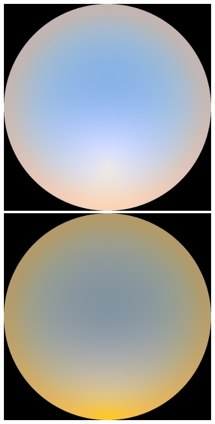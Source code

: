 \begin{figure}
{ }
 \hfill
 \subtop
 {
 \includegraphics[scale=0.125]{figures/preetham_sRGB_D65_turbidity_4_thetaSun_60.png}
 }
 \hfill
 \subtop
 {
 \includegraphics[scale=0.125]{figures/preetham_sRGB_D65_turbidity_4_thetaSun_90.png}
}
\end{figure}
